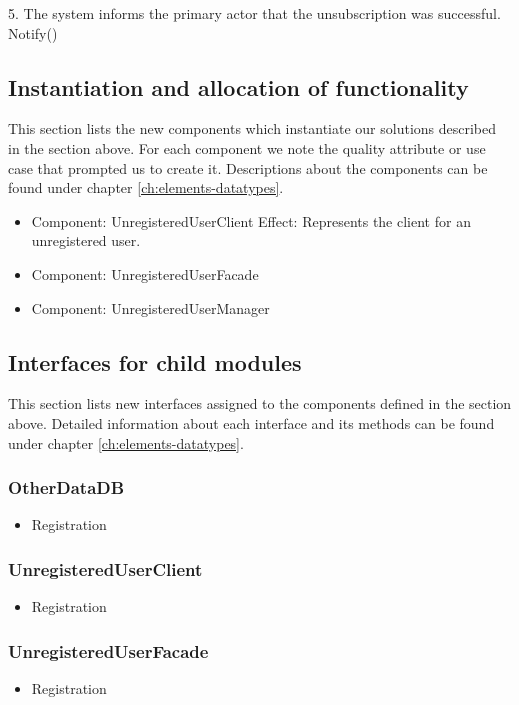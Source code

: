{{{{{{{{            
        5. The system informs the primary actor that the unsubscription was successful.
            Notify()

\subsection{Instantiation and allocation of functionality}
    This section lists the new components which instantiate our solutions
    described in the section above. For each component we note the quality
    attribute or use case that prompted us to create it. Descriptions about
    the components can be found under chapter \ref{ch:elements-datatypes}. \\

    \begin{itemize}
        \item Component: UnregisteredUserClient
              Effect: Represents the client for an unregistered user.
        \item Component: UnregisteredUserFacade
        \item Component: UnregisteredUserManager
    \end{itemize}


\subsection{Interfaces for child modules}
    This section lists new interfaces assigned to the components defined
    in the section above. Detailed information about each interface and
    its methods can be found under chapter \ref{ch:elements-datatypes}. \\

    \subsubsection{OtherDataDB}
        \begin{itemize}
            \item Registration
        \end{itemize}
    \subsubsection{UnregisteredUserClient}
        \begin{itemize}
            \item Registration
        \end{itemize}
    \subsubsection{UnregisteredUserFacade}
        \begin{itemize}
            \item Registration
        \end{itemize}
}}}}}}}}
